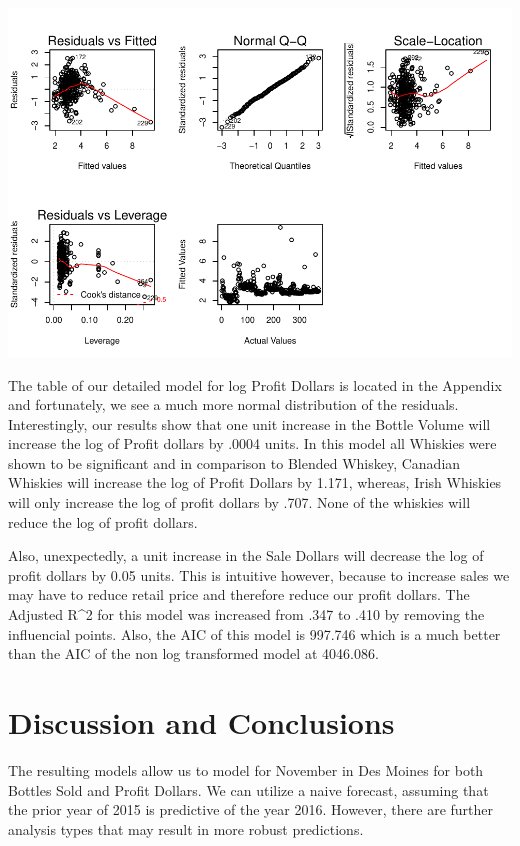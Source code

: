 \documentclass[]{elsarticle} %
\makeatletter
\def\maxwidth{\ifdim\Gin@nat@width>\linewidth\linewidth
\else\Gin@nat@width\fi}
\let\Oldincludegraphics\includegraphics
\renewcommand{\includegraphics}[1]{\Oldincludegraphics[width=\maxwidth]{#1}}
\makeatother
\begin{document}
\includegraphics{Final_Project_files/figure-latex/unnamed-chunk-22-1.pdf}

The table of our detailed model for log Profit Dollars is located in the
Appendix and fortunately, we see a much more normal distribution of the
residuals. Interestingly, our results show that one unit increase in the
Bottle Volume will increase the log of Profit dollars by .0004 units. In
this model all Whiskies were shown to be significant and in comparison
to Blended Whiskey, Canadian Whiskies will increase the log of Profit
Dollars by 1.171, whereas, Irish Whiskies will only increase the log of
profit dollars by .707. None of the whiskies will reduce the log of
profit dollars.

Also, unexpectedly, a unit increase in the Sale Dollars will decrease
the log of profit dollars by 0.05 units. This is intuitive however,
because to increase sales we may have to reduce retail price and
therefore reduce our profit dollars. The Adjusted R\^{}2 for this model
was increased from .347 to .410 by removing the influencial points.
Also, the AIC of this model is 997.746 which is a much better than the
AIC of the non log transformed model at 4046.086.

\section{Discussion and Conclusions}\label{discussion-and-conclusions}

The resulting models allow us to model for November in Des Moines for
both Bottles Sold and Profit Dollars. We can utilize a naive forecast,
assuming that the prior year of 2015 is predictive of the year 2016.
However, there are further analysis types that may result in more robust
predictions.
\end{document}
